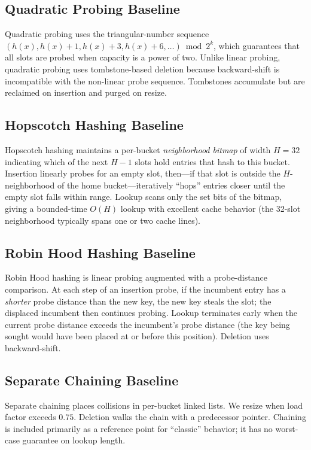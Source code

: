 \documentclass[10pt,journal,compsoc]{IEEEtran}
\begin{document}
\subsection{Quadratic Probing Baseline}
Quadratic probing uses the triangular-number sequence $(h(x), h(x)+1, h(x)+3, h(x)+6, \ldots) \bmod 2^k$, which guarantees that all slots are probed when capacity is a power of two. Unlike linear probing, quadratic probing uses tombstone-based deletion because backward-shift is incompatible with the non-linear probe sequence. Tombstones accumulate but are reclaimed on insertion and purged on resize.

\subsection{Hopscotch Hashing Baseline}
Hopscotch hashing maintains a per-bucket \emph{neighborhood bitmap} of width $H=32$ indicating which of the next $H-1$ slots hold entries that hash to this bucket. Insertion linearly probes for an empty slot, then---if that slot is outside the $H$-neighborhood of the home bucket---iteratively ``hops'' entries closer until the empty slot falls within range. Lookup scans only the set bits of the bitmap, giving a bounded-time $O(H)$ lookup with excellent cache behavior (the 32-slot neighborhood typically spans one or two cache lines).

\subsection{Robin Hood Hashing Baseline}
Robin Hood hashing is linear probing augmented with a probe-distance comparison. At each step of an insertion probe, if the incumbent entry has a \emph{shorter} probe distance than the new key, the new key steals the slot; the displaced incumbent then continues probing. Lookup terminates early when the current probe distance exceeds the incumbent's probe distance (the key being sought would have been placed at or before this position). Deletion uses backward-shift.

\subsection{Separate Chaining Baseline}
Separate chaining places collisions in per-bucket linked lists. We resize when load factor exceeds $0.75$. Deletion walks the chain with a predecessor pointer. Chaining is included primarily as a reference point for ``classic'' behavior; it has no worst-case guarantee on lookup length.
\end{document}
